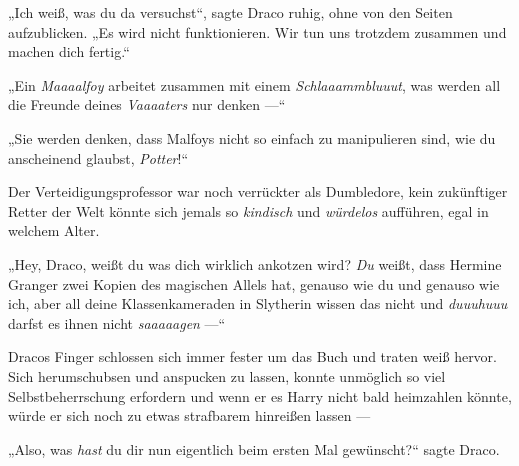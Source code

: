 „Ich weiß, was du da versuchst“, sagte Draco ruhig, ohne von den Seiten aufzublicken.
„Es wird nicht funktionieren. Wir tun uns trotzdem zusammen und machen dich fertig.“

„Ein \emph{Maaaalfoy} arbeitet zusammen mit einem \emph{Schlaaammbluuut}, was werden all die Freunde deines \emph{Vaaaaters} nur denken —“

„Sie werden denken, dass Malfoys nicht so einfach zu manipulieren sind, wie du anscheinend glaubst, \emph{Potter}!“

Der Verteidigungsprofessor war noch verrückter als Dumbledore, kein zukünftiger Retter der Welt könnte sich jemals so \emph{kindisch} und \emph{würdelos} aufführen, egal in welchem Alter.

„Hey, Draco, weißt du was dich wirklich ankotzen wird? \emph{Du} weißt, dass Hermine Granger zwei Kopien des magischen Allels hat, genauso wie du und genauso wie ich, aber all deine Klassenkameraden in Slytherin wissen das nicht und \emph{duuuhuuu} darfst es ihnen nicht \emph{saaaaagen} —“

Dracos Finger schlossen sich immer fester um das Buch und traten weiß hervor. Sich herumschubsen und anspucken zu lassen, konnte unmöglich so viel Selbstbeherrschung erfordern und wenn er es Harry nicht bald heimzahlen könnte, würde er sich noch zu etwas strafbarem hinreißen lassen —

„Also, was \emph{hast} du dir nun eigentlich beim ersten Mal gewünscht?“ sagte Draco.

